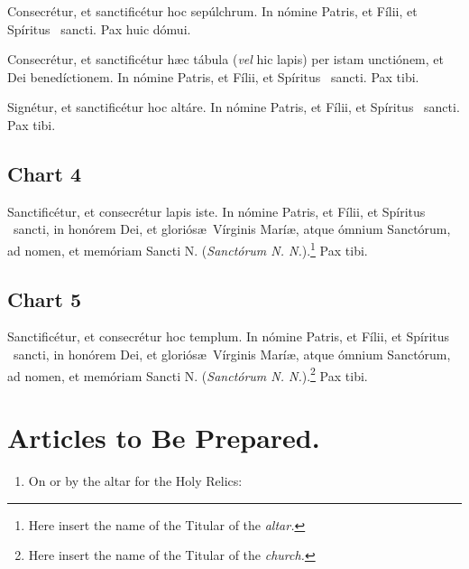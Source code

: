 \documentclass[letterpaper]{report}
\begin{document}
{    Conse\cross cr\'etur, et sancti\cross fic\'etur hoc sep\'ulchrum. In
    n\'omine Pa\cross tris, et F\'i\cross lii, et Sp\'iritus \cross\ sancti.
    Pax huic d\'omui.

    Conse\cross cr\'etur, et sancti\cross fic\'etur h\ae c t\'abula
    (\textit{vel} hic lapis) per istam uncti\'onem, et Dei bened\'ictionem. In
    n\'omine Pa\cross tris, et F\'i\cross lii, et Sp\'iritus \cross\ sancti.
    Pax tibi.

    Sign\'e\cross tur, et sancti\cross fic\'etur hoc alt\'are. In n\'omine
    Pa\cross tris, et F\'i\cross lii, et Sp\'iritus \cross\ sancti. Pax tibi.

    \subsection*{Chart 4}

    Sancti\cross fic\'etur, et conse\cross cr\'etur lapis iste. In n\'omine
    Pa\cross tris, et F\'i\cross lii, et Sp\'iritus \cross\ sancti, in
    hon\'orem Dei, et glori\'os\ae\ V\'irginis Mar\'i\ae, atque \'omnium
    Sanct\'orum, ad nomen, et mem\'oriam Sancti N. (\textit{Sanct\'orum N.
    N.}).\footnote{Here insert the name of the Titular of the \textit{altar.}}
    Pax tibi.

    \subsection*{Chart 5}

    Sancti\cross fic\'etur, et conse\cross cr\'etur hoc templum. In n\'omine
    Pa\cross tris, et F\'i\cross lii, et Sp\'iritus \cross\ sancti, in
    hon\'orem Dei, et glori\'os\ae\ V\'irginis Mar\'i\ae, atque \'omnium
    Sanct\'orum, ad nomen, et mem\'oriam Sancti N. (\textit{Sanct\'orum N.
    N.}).\footnote{Here insert the name of the Titular of the \textit{church.}}
    Pax tibi.

    \section{Articles to Be Prepared.}

    \begin{enumerate}[label=\Roman*.]

        \item On or by the altar for the Holy Relics:

            \begin{enumerate}[label=\arabic*.]


\end{enumerate}
\end{enumerate}}
\end{document}
